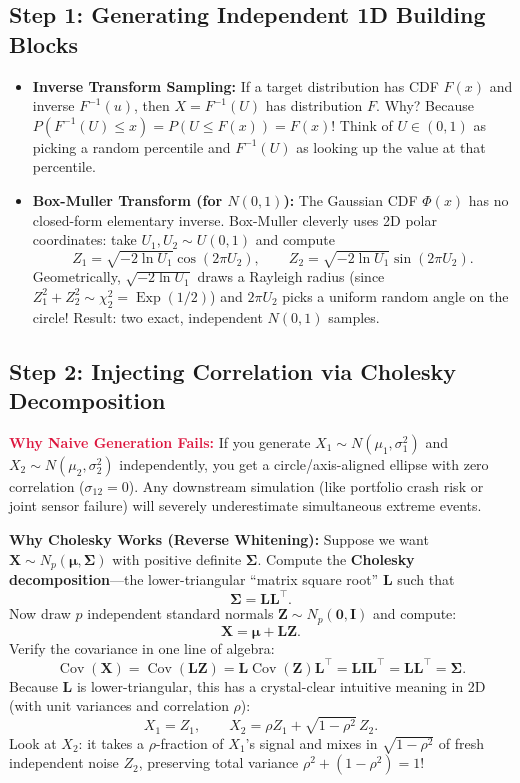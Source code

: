 \documentclass[11pt, a4paper]{article}
\begin{document}
\subsection{Step 1: Generating Independent 1D Building Blocks}
\begin{itemize}
    \item \textbf{Inverse Transform Sampling:} If a target distribution has CDF $F(x)$ and inverse $F^{-1}(u)$, then $X = F^{-1}(U)$ has distribution $F$. Why? Because $P(F^{-1}(U) \le x) = P(U \le F(x)) = F(x)$! Think of $U \in (0,1)$ as picking a random percentile and $F^{-1}(U)$ as looking up the value at that percentile.
    \item \textbf{Box-Muller Transform (for $N(0,1)$):} The Gaussian CDF $\Phi(x)$ has no closed-form elementary inverse. Box-Muller cleverly uses 2D polar coordinates: take $U_1, U_2 \sim U(0,1)$ and compute
    \[
        Z_1 = \sqrt{-2 \ln U_1}\cos(2\pi U_2), \qquad Z_2 = \sqrt{-2 \ln U_1}\sin(2\pi U_2).
    \]
    Geometrically, $\sqrt{-2\ln U_1}$ draws a Rayleigh radius (since $Z_1^2 + Z_2^2 \sim \chi_2^2 = \operatorname{Exp}(1/2)$) and $2\pi U_2$ picks a uniform random angle on the circle! Result: two exact, independent $N(0,1)$ samples.
\end{itemize}

\subsection{Step 2: Injecting Correlation via Cholesky Decomposition}
\textcolor{crimson}{\textbf{Why Naive Generation Fails:}} If you generate $X_1 \sim N(\mu_1, \sigma_1^2)$ and $X_2 \sim N(\mu_2, \sigma_2^2)$ independently, you get a circle/axis-aligned ellipse with zero correlation ($\sigma_{12} = 0$). Any downstream simulation (like portfolio crash risk or joint sensor failure) will severely underestimate simultaneous extreme events.

\textbf{Why Cholesky Works (Reverse Whitening):} Suppose we want $\mathbf{X} \sim N_p(\boldsymbol{\mu}, \boldsymbol{\Sigma})$ with positive definite $\boldsymbol{\Sigma}$. Compute the \textbf{Cholesky decomposition}---the lower-triangular ``matrix square root'' $\mathbf{L}$ such that
\[
    \boldsymbol{\Sigma} = \mathbf{L}\mathbf{L}^\top.
\]
Now draw $p$ independent standard normals $\mathbf{Z} \sim N_p(\mathbf{0}, \mathbf{I})$ and compute:
\[
    \mathbf{X} = \boldsymbol{\mu} + \mathbf{L}\mathbf{Z}.
\]
Verify the covariance in one line of algebra:
\[
    \operatorname{Cov}(\mathbf{X}) = \operatorname{Cov}(\mathbf{L}\mathbf{Z}) = \mathbf{L}\operatorname{Cov}(\mathbf{Z})\mathbf{L}^\top = \mathbf{L}\mathbf{I}\mathbf{L}^\top = \mathbf{L}\mathbf{L}^\top = \boldsymbol{\Sigma}.
\]
Because $\mathbf{L}$ is lower-triangular, this has a crystal-clear intuitive meaning in 2D (with unit variances and correlation $\rho$):
\[
    X_1 = Z_1, \qquad X_2 = \rho Z_1 + \sqrt{1 - \rho^2}\, Z_2.
\]
Look at $X_2$: it takes a $\rho$-fraction of $X_1$'s signal and mixes in $\sqrt{1-\rho^2}$ of fresh independent noise $Z_2$, preserving total variance $\rho^2 + (1-\rho^2) = 1$!
\end{document}
